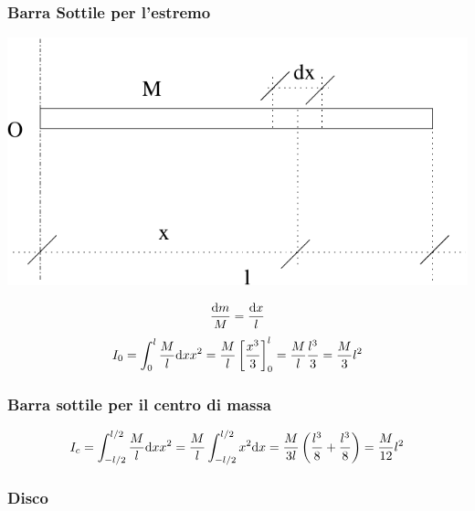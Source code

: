 \begin{minipage}[c]{\textwidth}
\subsubsection{Barra Sottile per l'estremo}

   \centering
   \includegraphics[scale=0.4]{immagini/fisica1/sbarra_sottile1}

\begin{equation*}\frac{\mathrm{d} m}{M}=\frac{\mathrm{d} x}{l}\end{equation*}
\begin{equation*}I_0=\int_0^l\frac{M}{l}\mathrm{d} x x^2=\frac{M}{l}\left[\frac{x^3}{3}\right]_0^l=\frac{M}{l}\frac{l^3}{3}=\frac{M}{3}l^2\end{equation*}
\end{minipage}

\subsubsection{Barra sottile per il centro di massa}
\[I_c=\int_{-l/2}^{l/2}\frac{M}{l}\mathrm{d} x
x^2=\frac{M}{l}\int_{-l/2}^{l/2}x^2 \mathrm{d}
x=\frac{M}{3l}\left(\frac{l^3}{8}+\frac{l^3}{8}\right)=\frac{M}{12}l^2\]

\subsubsection{Disco}



